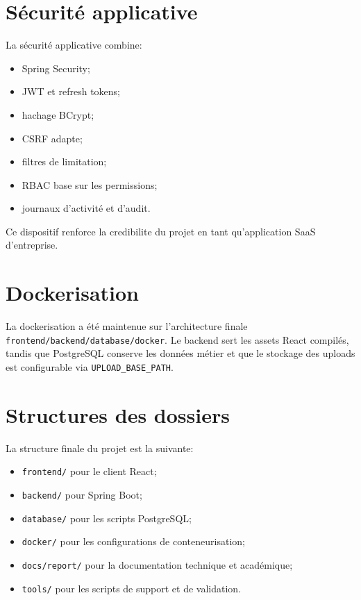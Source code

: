 \section{Sécurité applicative}
La sécurité applicative combine:
\begin{itemize}
  \item Spring Security;
  \item JWT et refresh tokens;
  \item hachage BCrypt;
  \item CSRF adapte;
  \item filtres de limitation;
  \item RBAC base sur les permissions;
  \item journaux d'activité et d'audit.
\end{itemize}

Ce dispositif renforce la credibilite du projet en tant qu'application SaaS d'entreprise.

\section{Dockerisation}
La dockerisation a été maintenue sur l'architecture finale \texttt{frontend/back\-end/database/docker}. Le backend sert les assets React compilés, tandis que PostgreSQL conserve les données métier et que le stockage des uploads est configurable via \texttt{UPLOAD\_BASE\_PATH}.

\begin{codeblock}[H]
\caption{Dockerfile de l'application Spring Boot}

\end{codeblock}

\section{Structures des dossiers}
La structure finale du projet est la suivante:
\begin{itemize}
  \item \texttt{frontend/} pour le client React;
  \item \texttt{backend/} pour Spring Boot;
  \item \texttt{database/} pour les scripts PostgreSQL;
  \item \texttt{docker/} pour les configurations de conteneurisation;
  \item \texttt{docs/report/} pour la documentation technique et académique;
  \item \texttt{tools/} pour les scripts de support et de validation.
\end{itemize}

